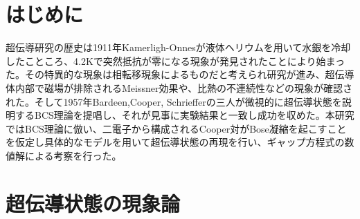 \documentclass[dvipdfmx, 11pt, twocolumn]{jsarticle}
\begin{document}
{}%
\section{はじめに}
超伝導研究の歴史は1911年Kamerligh-Onnesが液体ヘリウムを用いて水銀を冷却したこところ、4.2Kで突然抵抗が零になる現象が発見されたことにより始まった。その特異的な現象は相転移現象によるものだと考えられ研究が進み、超伝導体内部で磁場が排除されるMeissner効果や、比熱の不連続性などの現象が確認された。そして1957年Bardeen,Cooper, Schriefferの三人が微視的に超伝導状態を説明するBCS理論を提唱し、それが見事に実験結果と一致し成功を収めた。本研究ではBCS理論に倣い、二電子から構成されるCooper対がBose凝縮を起こすことを仮定し具体的なモデルを用いて超伝導状態の再現を行い、ギャップ方程式の数値解による考察を行った。
\section{超伝導状態の現象論}
\end{document}
